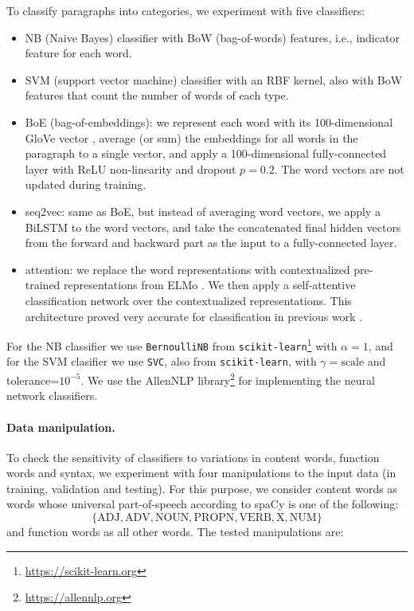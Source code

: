 \documentclass[11pt,a4paper,table]{article}
\begin{document}
To classify paragraphs into categories, we experiment with five classifiers:

\begin{itemize}
  \item NB (Naive Bayes) classifier
  with BoW (bag-of-words) features, i.e., indicator feature for each word.
  \item SVM (support vector machine) classifier with an RBF kernel,
  also with BoW features that count the number of words of each type.
  \item BoE (bag-of-embeddings): we represent each word with its 100-dimensional
  GloVe vector \cite{pennington2014glove}, average (or sum) the embeddings for all words in the paragraph
  to a single vector, and apply a 100-dimensional fully-connected layer with
  ReLU non-linearity and dropout $p=0.2$.
  The word vectors are not updated during training.
  \item seq2vec: same as BoE, but instead of averaging word vectors,
  we apply a BiLSTM to the word vectors, and take the concatenated
  final hidden vectors from the forward and backward part as the input to a
  fully-connected layer.
  \item attention: we replace the word representations with contextualized
  pre-trained representations from ELMo \cite{Peters:2018}. We then apply a self-attentive
  classification network \cite{mccann2017learned} over the contextualized representations. This architecture proved very accurate for classification in
  previous work \cite{W18-5427,D18-1401}.
\end{itemize}

For the NB classifier we use \texttt{BernoulliNB} from
\texttt{scikit-learn}\footnote{\url{https://scikit-learn.org}}
with $\alpha=1$,
and for the SVM clasifier we use \texttt{SVC}, also from \texttt{scikit-learn},
with $\gamma=\mathrm{scale}$ and tolerance=$10^{-5}$.
We use the AllenNLP  library\footnote{\url{https://allennlp.org}}
\cite{Gardner2017AllenNLP} for implementing the neural network classifiers.

\paragraph{Data manipulation.}

To check the sensitivity of classifiers to variations in content words,
function words and syntax, we experiment with four manipulations to the input
data (in training, validation and testing).
For this purpose, we consider content words as words whose universal part-of-speech
according to spaCy is one of the following:
\[\{\mathrm{ADJ, ADV, NOUN, PROPN, VERB, X, NUM}\}\]
and function words as all other words.
The tested manipulations are:
\end{document}
